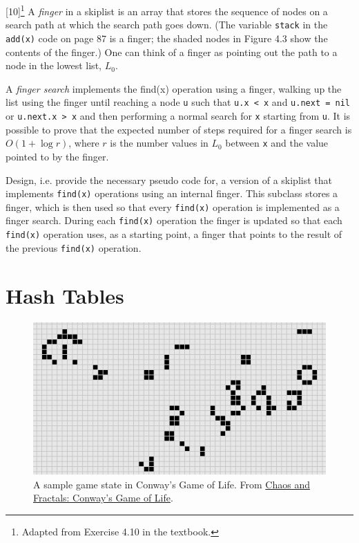 \documentclass[addpoints]{exam}
\begin{document}
\begin{questions}
[10]\footnote{Adapted from Exercise 4.10 in the textbook.}
  A \textit{finger} in a skiplist is an array that stores the sequence of nodes on a search path at which the search path goes down. (The variable \texttt{stack} in the \texttt{add(x)} code on page 87 is a finger; the shaded nodes in Figure 4.3 show the contents of the finger.) One can think of a finger as pointing out the path to a node in the lowest list, $L_0$.
  
  A \textit{finger search} implements the find(x) operation using a finger, walking up the list using the finger until reaching a node \texttt{u} such that \texttt{u.x < x} and \texttt{u.next = nil} or \texttt{u.next.x > x} and then performing a normal search for \texttt{x} starting from \texttt{u}. It is possible to prove that the expected number of steps required for a finger search is $O(1+\log r)$, where $r$ is the number values in $L_0$ between \texttt{x} and the value pointed to by the finger.

  Design, i.e. provide the necessary pseudo code for, a version of a skiplist that implements \texttt{find(x)} operations using an internal finger. This subclass stores a finger, which is then used so that every \texttt{find(x)} operation is implemented as a finger search. During each \texttt{find(x)} operation the finger is updated so that each \texttt{find(x)} operation uses, as a starting point, a finger that points to the result of the previous \texttt{find(x)} operation.
  \begin{solution}
  \end{solution}
\end{questions}

\part{Hash Tables}

\begin{figure}[!h]
  \centering
  \includegraphics[scale=.8]{banner}
  \caption{A sample game state in Conway's Game of Life. From \href{http://pi.math.cornell.edu/~lipa/mec/lesson6.html}{Chaos and Fractals: Conway's Game of Life}.}
\end{figure}
\end{document}
